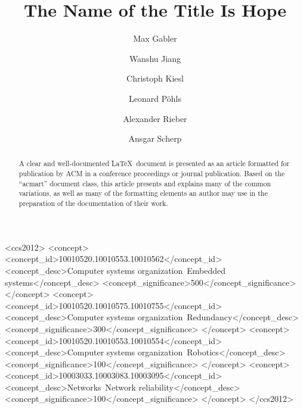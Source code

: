 \documentclass[manuscript,screen,review]{acmart}
\begin{document}
\title[Hope]{The Name of the Title Is Hope}



  \author{Max Gabler}
  
    \author{Wanshu Jiang}
  
    \author{Christoph Kiesl}
  
    \author{Leonard Pöhls}
  
    \author{Alexander Rieber}
  
    \author{Ansgar Scherp}
  
  
\renewcommand{\shortauthors}{Trovato et al.}

\begin{abstract}
A clear and well-documented \LaTeX~document is presented as an article
formatted for publication by ACM in a conference proceedings or journal
publication. Based on the ``acmart'' document class, this article
presents and explains many of the common variations, as well as many of
the formatting elements an author may use in the preparation of the
documentation of their work.    
\end{abstract}

\begin{CCSXML}
<ccs2012>
 <concept>
  <concept_id>10010520.10010553.10010562</concept_id>
  <concept_desc>Computer systems organization~Embedded systems</concept_desc>
  <concept_significance>500</concept_significance>
 </concept>
 <concept>
  <concept_id>10010520.10010575.10010755</concept_id>
  <concept_desc>Computer systems organization~Redundancy</concept_desc>
  <concept_significance>300</concept_significance>
 </concept>
 <concept>
  <concept_id>10010520.10010553.10010554</concept_id>
  <concept_desc>Computer systems organization~Robotics</concept_desc>
  <concept_significance>100</concept_significance>
 </concept>
 <concept>
  <concept_id>10003033.10003083.10003095</concept_id>
  <concept_desc>Networks~Network reliability</concept_desc>
  <concept_significance>100</concept_significance>
 </concept>
</ccs2012>
\end{CCSXML}
\end{document}
